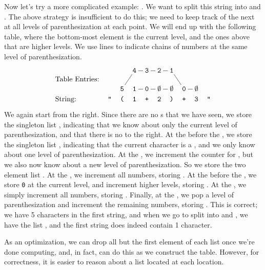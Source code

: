     Now let's try a more complicated example: .  We want to split this string into  and .  The above strategy is insufficient to do this; we need to keep track of the next \terminal{+} at all levels of parenthesization at each point.  We will end up with the following table, where the bottom-most element is the current level, and the ones above that are higher levels.  We use lines to indicate chains of numbers at the same level of parenthesization.    
    \[
    \xymatrix@C=0.5pc@R=0pc{
    &&&\texttt{4}\ar@{-}[r] &\texttt{3}\ar@{-}[r] &\texttt{2}\ar@{-}[r] &\texttt{1}\ar@{-}[ddr]\\
    \text{Table Entries:} \\
    &&\texttt{5}\ar@{-}[uur]&\texttt{1}\ar@{-}[r] &\texttt{0}\ar@{-}[r] &\nullentry\ar@{-}[r] &\nullentry&\texttt{0}\ar@{-}[r] &\nullentry\\
    \aswidthof{\text{String:}}{\text{Table Entries:}} & \stropen & \strcolored{(} & \strcolored{1} & \strcolored{+} & \strcolored{2} & \strcolored{)} & \strcolored{+} & \strcolored{3} & \strclose
    }
    \]    
    We again start from the right.  Since there are no \terminal{+}s that we have seen, we store the singleton list , indicating that we know about only the current level of parenthesization, and that there is no \terminal{+} to the right.  At the \terminal{+} before the , we store the singleton list , indicating that the current character is a \terminal{+}, and we only know about one level of parenthesization.  At the \terminal{)}, we increment the counter for \terminal{+}, but we also now know about a new level of parenthesization.  So we store the two element list .  At the , we increment all numbers, storing .  At the \terminal{+} before the , we store \texttt{0} at the current level, and increment higher levels, storing .  At the , we simply increment all numbers, storing .  Finally, at the \terminal{(}, we pop a level of parenthesization and increment the remaining numbers, storing .  This is correct; we have 5 characters in the first string, and when we go to split  into  and , we have the list , and the first string does indeed contain 1 character.
    
    As an optimization, we can drop all but the first element of each list once we're done computing, and, in fact, can do this as we construct the table.  However, for correctness, it is easier to reason about a list located at each location.
    

